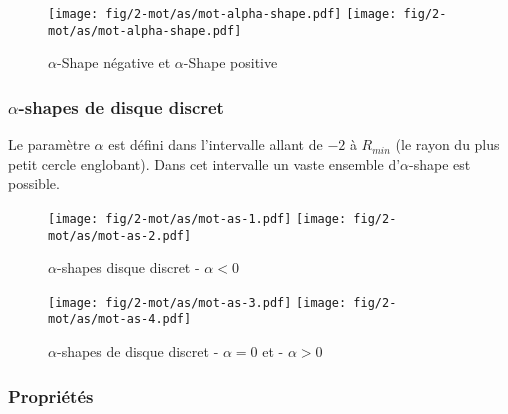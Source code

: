 \begin{figure}[H]
  \centering
  \texttt{[image: fig/2-mot/as/mot-alpha-shape.pdf]}
  \texttt{[image: fig/2-mot/as/mot-alpha-shape.pdf]}
  \caption{$\alpha$-Shape négative et $\alpha$-Shape positive }
\end{figure}


\subsubsection{$\alpha$-shapes de disque discret}

Le paramètre $\alpha$ est défini dans l'intervalle allant de $-2$ à $R_{min}$ (le rayon du plus petit cercle englobant). 
Dans cet intervalle un vaste ensemble d'$\alpha$-shape est possible.  

\begin{figure}[H]
  \centering
  \texttt{[image: fig/2-mot/as/mot-as-1.pdf]}
  \texttt{[image: fig/2-mot/as/mot-as-2.pdf]}
  \caption{$\alpha$-shapes disque discret - $\alpha < 0$}
\end{figure}

\begin{figure}[H]
  \centering
  \texttt{[image: fig/2-mot/as/mot-as-3.pdf]}
  \texttt{[image: fig/2-mot/as/mot-as-4.pdf]}
  \caption{$\alpha$-shapes de disque discret - $\alpha = 0$ et - $\alpha > 0$}
\end{figure}



\subsubsection{Propriétés}


